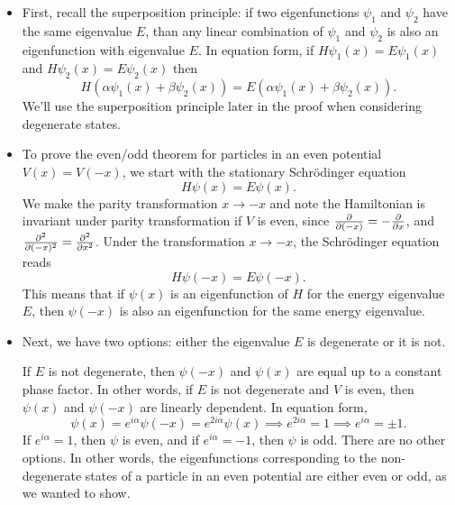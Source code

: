 \documentclass[11pt, a4paper]{article}
\newcommand{\Schro}{Schr\"{o}dinger\xspace}
\begin{document}
\begin{itemize}
	\item First, recall the superposition principle: if two eigenfunctions $ \psi_{1} $ and $ \psi_{2} $ have the same eigenvalue $ E $, than any linear combination of $ \psi_{1} $ and $ \psi_{2} $ is also an eigenfunction with eigenvalue $ E $. In equation form, if $ H\psi_{1}(x) = E \psi_{1}(x) $ and $ H\psi_{2}(x) = E \psi_{2}(x) $ then
	\begin{equation*}
		H\left(\alpha \psi_{1}(x) + \beta \psi_{2}(x)\right) = E \left(\alpha \psi_{1}(x) + \beta \psi_{2}(x)\right).
	\end{equation*}
	We'll use the superposition principle later in the proof when considering degenerate states.

	\item To prove the even/odd theorem for particles in an even potential $ V(x) = V(-x) $, we start with the stationary \Schro equation
	\begin{equation*}
		H\psi(x) = E \psi(x).
	\end{equation*}
	We make the parity transformation $ x \to -x $ and note the Hamiltonian is invariant under parity transformation if $ V $ is even, since $ \pdv{}{(-x)} = - \pdv{}{x} $, and $ \pdv[2]{}{(-x)} = \pdv[2]{}{x} $. Under the transformation $ x \to -x $, the \Schro equation reads
	\begin{equation*}
		H\psi(-x) = E\psi(-x).
	\end{equation*}
	This means that if $ \psi(x) $ is an eigenfunction of $ H $ for the energy eigenvalue $ E $, then $ \psi(-x) $ is also an eigenfunction for the same energy eigenvalue.
	
	\item Next, we have two options: either the eigenvalue $ E $ is degenerate or it is not.
	
	If $ E $ is not degenerate, then $ \psi(-x) $ and  $\psi(x) $ are equal up to a constant phase factor. In other words, if $ E $ is not degenerate and $ V $ is even, then $ \psi(x) $ and $ \psi(-x) $ are linearly dependent. In equation form,
	\begin{equation*}
		 \psi(x) = e^{i\alpha}\psi(-x) = e^{2i\alpha}\psi(x) \implies e^{2i\alpha} = 1 \implies e^{i\alpha} = \pm 1.
	\end{equation*}
	If $ e^{i\alpha} = 1 $, then $ \psi $ is even, and if $ e^{i\alpha} = - 1 $, then $ \psi $ is odd. There are no other options. In other words, the eigenfunctions corresponding to the non-degenerate states of a particle in an even potential are either even or odd, as we wanted to show.
	

\end{itemize}
\end{document}
